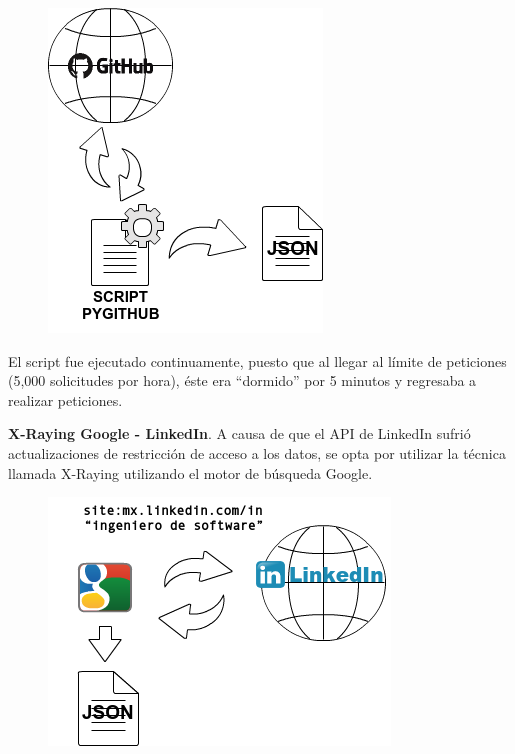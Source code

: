 \begin{figure}[H]
	\centering
	\includegraphics[height=0.22\textheight]{fig01/extraccion_git}
	\label{fig:RHP02}
\end{figure}

El script fue ejecutado continuamente, puesto que al llegar al límite de peticiones (5,000 solicitudes por hora), éste era “dormido” por 5 minutos y regresaba a realizar peticiones. 

\textbf{X-Raying Google - LinkedIn}. 
A causa de que el API de LinkedIn sufrió actualizaciones de restricción de acceso a los datos, se opta por utilizar la técnica llamada X-Raying utilizando el motor de búsqueda Google.

\begin{figure}[H]
	\centering
	\includegraphics[height=0.18\textheight]{fig01/extraccion_link}
	\label{fig:RHP02}
\end{figure}

